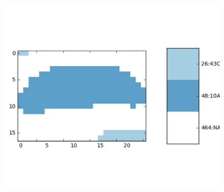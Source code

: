 \begin{figure}[!htb]
\begin{minipage}[c]{.33\linewidth}
  \end{minipage} \hfill
  \begin{minipage}[c]{.32\linewidth}
    \includegraphics[width=\textwidth]{figures/sample1labels.png}
  \end{minipage}


\end{figure}
